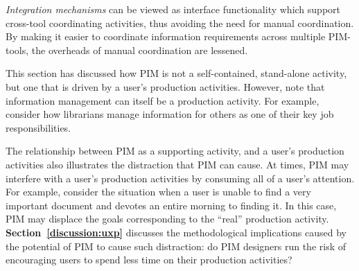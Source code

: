 \begin{enumerate}
\textit{Integration mechanisms} can be viewed as interface functionality which support cross-tool coordinating activities, thus avoiding the need for manual coordination. By making it easier to coordinate information requirements across multiple PIM-tools, the overheads of manual coordination are lessened.

\end{enumerate}



This section has discussed how PIM is not a self-contained, stand-alone activity, but one that is driven by a user's production activities.  However, note that information management can itself be a production activity.  For example, consider how librarians manage information for others as one of their key job responsibilities.

The relationship between PIM as a supporting activity, and a user's production activities also illustrates the distraction that PIM can cause.  At times, PIM may interfere with a user's production activities by consuming all of a user's attention.  For example, consider the situation when a user is unable to find a very important document and devotes an entire morning to finding it. In this case, PIM may displace the goals corresponding to the ``real'' production activity. \textbf{Section~\ref{discussion:uxp}} discusses the methodological implications caused by the potential of PIM to cause such distraction: do PIM designers run the risk of encouraging users to spend less time on their production activities?






